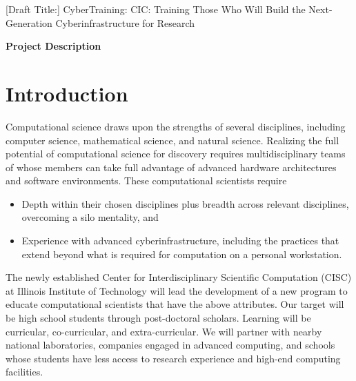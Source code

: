 \documentclass[11pt]{NSFamsart}
\begin{document}
[Draft Title:]  	CyberTraining: CIC:  Training Those Who Will Build the Next-Generation Cyberinfrastructure for Research

\centerline{\Large \textbf{Project Description}}
\vspace{-2ex}

\setcounter{tocdepth}{1}
\tableofcontents %

\vspace{-6ex}

\section{Introduction}
Computational science draws upon the strengths of several disciplines, including computer science, mathematical science, and natural science.  Realizing the full potential of computational science for discovery requires multidisciplinary teams of whose members can take full advantage of advanced hardware architectures and software environments.  These computational scientists require

\begin{itemize}
\item Depth within their chosen disciplines plus breadth across relevant disciplines, overcoming a silo mentality, and
\item Experience with advanced cyberinfrastructure, including the practices that extend beyond what is required for computation on a personal workstation.
\end{itemize}

The newly established Center for Interdisciplinary Scientific Computation (CISC) at Illinois Institute of Technology will lead the development of a new program to educate computational scientists that have the above attributes.  Our target will be high school students through post-doctoral scholars.  Learning will be curricular, co-curricular, and extra-curricular.  We will partner with nearby national laboratories, companies engaged in advanced computing, and schools whose students have less access to research experience and high-end computing facilities.
\end{document}
